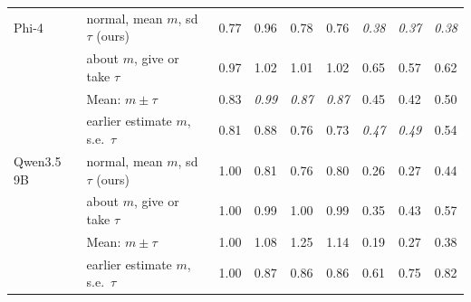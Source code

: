 \begin{tabular}{llccccccc}
Phi-4 & normal, mean $m$, sd $\tau$ (ours) & 0.77 & 0.96 & 0.78 & 0.76 & \textit{0.38} & \textit{0.37} & \textit{0.38} \\
 & about $m$, give or take $\tau$ & 0.97 & 1.02 & 1.01 & 1.02 & 0.65 & 0.57 & 0.62 \\
 & Mean: $m \pm \tau$ & 0.83 & \textit{0.99} & \textit{0.87} & \textit{0.87} & 0.45 & 0.42 & 0.50 \\
 & earlier estimate $m$, s.e.\ $\tau$ & 0.81 & 0.88 & 0.76 & 0.73 & \textit{0.47} & \textit{0.49} & 0.54 \\
\midrule
Qwen3.5 9B & normal, mean $m$, sd $\tau$ (ours) & 1.00 & 0.81 & 0.76 & 0.80 & 0.26 & 0.27 & 0.44 \\
 & about $m$, give or take $\tau$ & 1.00 & 0.99 & 1.00 & 0.99 & 0.35 & 0.43 & 0.57 \\
 & Mean: $m \pm \tau$ & 1.00 & 1.08 & 1.25 & 1.14 & 0.19 & 0.27 & 0.38 \\
 & earlier estimate $m$, s.e.\ $\tau$ & 1.00 & 0.87 & 0.86 & 0.86 & 0.61 & 0.75 & 0.82 \\
\bottomrule
\end{tabular}
